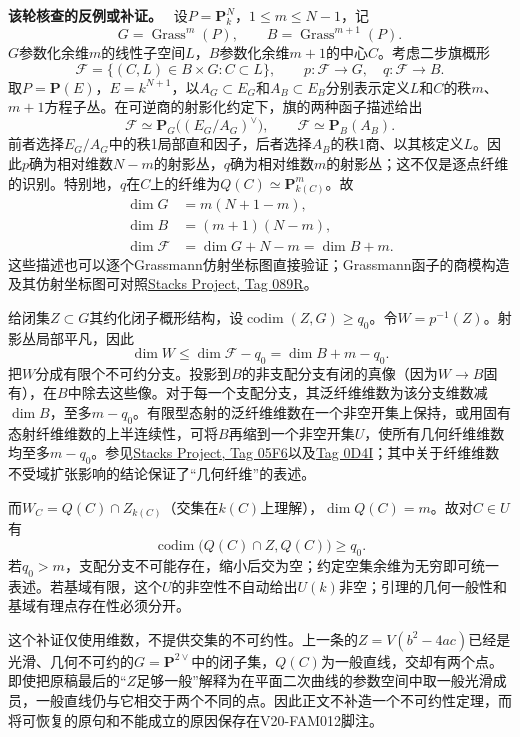 \documentclass[UTF8,a4paper]{ctexbook}
\DeclareMathOperator{\codim}{codim}
\newenvironment{analysisproof}{\par\noindent\textbf{该轮核查的反例或补证。}\ }{\par}
\begin{document}
\begin{analysisproof}
设$P=\mathbf P^N_k$，$1\le m\le N-1$，记
\[
G=\operatorname{Grass}^m(P),\qquad
B=\operatorname{Grass}^{m+1}(P).
\]
$G$参数化余维$m$的线性子空间$L$，$B$参数化余维$m+1$的中心$C$。考虑二步旗概形
\[
\mathcal F=\{(C,L)\in B\times G:C\subset L\},
\qquad p\colon\mathcal F\to G,\quad q\colon\mathcal F\to B.
\]
取$P=\mathbf P(E)$，$E=k^{N+1}$，以$A_G\subset E_G$和$A_B\subset E_B$分别表示定义$L$和$C$的秩$m$、$m+1$方程子丛。在可逆商的射影化约定下，旗的两种函子描述给出
\[
\mathcal F\simeq\mathbf P_G\bigl((E_G/A_G)^\vee\bigr),
\qquad
\mathcal F\simeq\mathbf P_B(A_B).
\]
前者选择$E_G/A_G$中的秩1局部直和因子，后者选择$A_B$的秩1商、以其核定义$L$。因此$p$确为相对维数$N-m$的射影丛，$q$确为相对维数$m$的射影丛；这不仅是逐点纤维的识别。特别地，$q$在$C$上的纤维为$Q(C)\simeq\mathbf P^m_{k(C)}$。故
\begin{align*}
\dim G&=m(N+1-m),\\
\dim B&=(m+1)(N-m),\\
\dim\mathcal F&=\dim G+N-m=\dim B+m.
\end{align*}
这些描述也可以逐个Grassmann仿射坐标图直接验证；Grassmann函子的商模构造及其仿射坐标图可对照\href{https://stacks.math.columbia.edu/tag/089R}{Stacks Project, Tag 089R}。

给闭集$Z\subset G$其约化闭子概形结构，设$\codim(Z,G)\ge q_0$。令$W=p^{-1}(Z)$。射影丛局部平凡，因此
\[
\dim W\le \dim\mathcal F-q_0=\dim B+m-q_0.
\]
把$W$分成有限个不可约分支。投影到$B$的非支配分支有闭的真像（因为$W\to B$固有），在$B$中除去这些像。对于每一个支配分支，其泛纤维维数为该分支维数减$\dim B$，至多$m-q_0$。有限型态射的泛纤维维数在一个非空开集上保持，或用固有态射纤维维数的上半连续性，可将$B$再缩到一个非空开集$U$，使所有几何纤维维数均至多$m-q_0$。参见\href{https://stacks.math.columbia.edu/tag/05F6}{Stacks Project, Tag 05F6}以及\href{https://stacks.math.columbia.edu/tag/0D4I}{Tag 0D4I}；其中关于纤维维数不受域扩张影响的结论保证了“几何纤维”的表述。

而$W_C=Q(C)\cap Z_{k(C)}$（交集在$k(C)$上理解），$\dim Q(C)=m$。故对$C\in U$有
\[
\codim\bigl(Q(C)\cap Z,Q(C)\bigr)\ge q_0.
\]
若$q_0>m$，支配分支不可能存在，缩小后交为空；约定空集余维为无穷即可统一表述。若基域有限，这个$U$的非空性不自动给出$U(k)$非空；引理的几何一般性和基域有理点存在性必须分开。
\end{analysisproof}

这个补证仅使用维数，不提供交集的不可约性。上一条的$Z=V(b^2-4ac)$已经是光滑、几何不可约的$G=\mathbf P^{2\vee}$中的闭子集，$Q(C)$为一般直线，交却有两个点。即使把原稿最后的“$Z$足够一般”解释为在平面二次曲线的参数空间中取一般光滑成员，一般直线仍与它相交于两个不同的点。因此正文不补造一个不可约性定理，而将可恢复的原句和不能成立的原因保存在V20-FAM012脚注。
\end{document}
